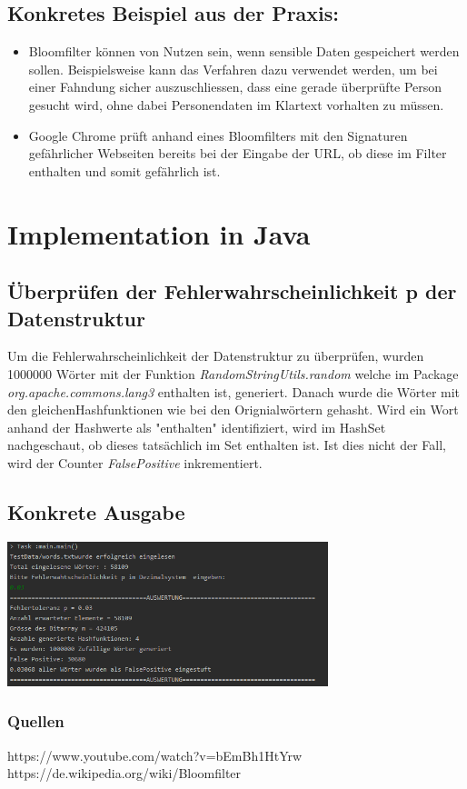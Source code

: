 \documentclass[12 pt]{article}
\begin{document}
\subsection{Konkretes Beispiel aus der Praxis: }
\begin{itemize}
    \item{Bloomfilter können von Nutzen sein, wenn sensible Daten gespeichert werden sollen. Beispielsweise kann das Verfahren dazu verwendet werden, um bei einer Fahndung sicher auszuschliessen, dass eine gerade überprüfte Person gesucht wird, ohne dabei Personendaten im Klartext vorhalten zu müssen.}
    \item{Google Chrome prüft anhand eines Bloomfilters mit den Signaturen gefährlicher Webseiten bereits bei der Eingabe der URL, ob diese im Filter enthalten und somit gefährlich ist.}
\end{itemize}
\pagebreak
\section{Implementation in Java}
\subsection{Überprüfen der Fehlerwahrscheinlichkeit p der Datenstruktur}
Um die Fehlerwahrscheinlichkeit der Datenstruktur zu überprüfen, wurden 1000000 Wörter mit der Funktion \emph{RandomStringUtils.random} welche im Package \emph{org.apache.commons.lang3} enthalten ist, generiert. Danach wurde die Wörter mit den gleichenHashfunktionen wie bei den Orignialwörtern gehasht. Wird ein Wort anhand der Hashwerte als "enthalten" identifiziert, wird im HashSet nachgeschaut, ob dieses tatsächlich im Set enthalten ist. Ist dies nicht der Fall, wird der Counter \emph{FalsePositive} inkrementiert.
\subsection{Konkrete Ausgabe}
\includegraphics[width=0.7\textwidth]{Ausgabe_Java.png}
\subsubsection{Quellen}
https://www.youtube.com/watch?v=bEmBh1HtYrw
\linebreak https://de.wikipedia.org/wiki/Bloomfilter
\end{document}

